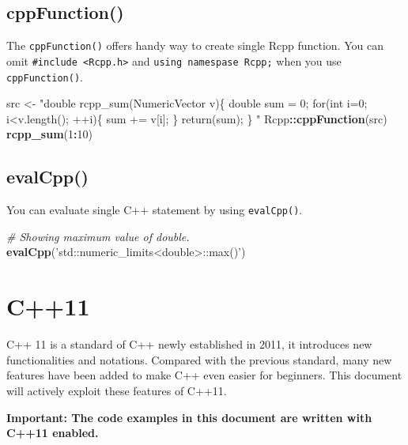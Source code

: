 \documentclass[]{book}
\newenvironment{Shaded}{\begin{snugshade}}{\end{snugshade}}
\newcommand{\CommentTok}[1]{\textcolor[rgb]{0.56,0.35,0.01}{\textit{#1}}}
\newcommand{\DecValTok}[1]{\textcolor[rgb]{0.00,0.00,0.81}{#1}}
\newcommand{\KeywordTok}[1]{\textcolor[rgb]{0.13,0.29,0.53}{\textbf{#1}}}
\newcommand{\NormalTok}[1]{#1}
\newcommand{\OperatorTok}[1]{\textcolor[rgb]{0.81,0.36,0.00}{\textbf{#1}}}
\newcommand{\StringTok}[1]{\textcolor[rgb]{0.31,0.60,0.02}{#1}}
\begin{document}
\hypertarget{cppfunction}{%
\section{cppFunction()}\label{cppfunction}}

The \texttt{cppFunction()} offers handy way to create single Rcpp function. You can omit \texttt{\#include\ \textless{}Rcpp.h\textgreater{}} and \texttt{using\ namespase\ Rcpp;} when you use \texttt{cppFunction()}.

\begin{Shaded}
\begin{Highlighting}[]
\NormalTok{src <-}
\StringTok{  "double rcpp_sum(NumericVector v)\{}
\StringTok{    double sum = 0;}
\StringTok{    for(int i=0; i<v.length(); ++i)\{}
\StringTok{      sum += v[i];}
\StringTok{    \}}
\StringTok{    return(sum);}
\StringTok{  \}}
\StringTok{  "}
\NormalTok{Rcpp}\OperatorTok{::}\KeywordTok{cppFunction}\NormalTok{(src)}
\KeywordTok{rcpp_sum}\NormalTok{(}\DecValTok{1}\OperatorTok{:}\DecValTok{10}\NormalTok{)}
\end{Highlighting}
\end{Shaded}

\hypertarget{evalcpp}{%
\section{evalCpp()}\label{evalcpp}}

You can evaluate single C++ statement by using \texttt{evalCpp()}.

\begin{Shaded}
\begin{Highlighting}[]
\CommentTok{# Showing maximum value of double.}
\KeywordTok{evalCpp}\NormalTok{(}\StringTok{'std::numeric_limits<double>::max()'}\NormalTok{)}
\end{Highlighting}
\end{Shaded}

\hypertarget{c11}{%
\chapter{C++11}\label{c11}}

C++ 11 is a standard of C++ newly established in 2011, it introduces new functionalities and notations. Compared with the previous standard, many new features have been added to make C++ even easier for beginners. This document will actively exploit these features of C++11.

\textbf{Important: The code examples in this document are written with C++11 enabled.}
\end{document}
